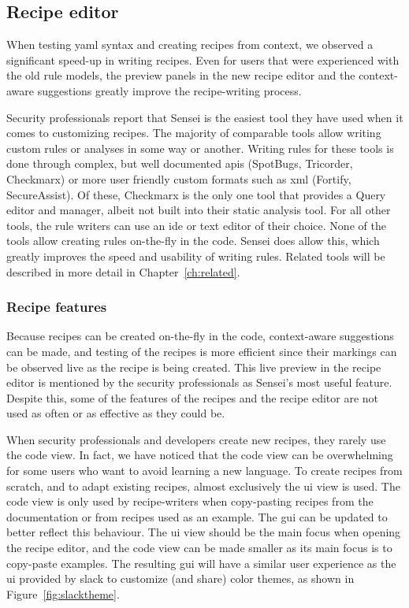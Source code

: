 \subsection{Recipe editor}
When testing \gls{yaml} syntax and creating recipes from context, we observed a significant speed-up in writing recipes.
Even for users that were experienced with the old rule models, the preview panels in the new recipe editor and the context-aware suggestions greatly improve the recipe-writing process.

Security professionals report that Sensei is the easiest tool they have used when it comes to customizing recipes.
The majority of comparable tools allow writing custom rules or analyses in some way or another.
Writing rules for these tools is done through complex, but well documented \glspl{api} (SpotBugs, Tricorder, Checkmarx) or more user friendly custom formats such as \gls{xml} (Fortify, SecureAssist).
Of these, Checkmarx is the only one tool that provides a Query editor and manager, albeit not built into their static analysis tool.
For all other tools, the rule writers can use an \gls{ide} or text editor of their choice.
None of the tools allow creating rules on-the-fly in the code.
Sensei does allow this, which greatly improves the speed and usability of writing rules.
Related tools will be described in more detail in Chapter~\ref{ch:related}.

\subsubsection{Recipe features}
Because recipes can be created on-the-fly in the code, context-aware suggestions can be made, and testing of the recipes is more efficient since their markings can be observed live as the recipe is being created.
This live preview in the recipe editor is mentioned by the security professionals as Sensei's most useful feature.
Despite this, some of the features of the recipes and the recipe editor are not used as often or as effective as they could be.

When security professionals and developers create new recipes, they rarely use the code view.
In fact, we have noticed that the code view can be overwhelming for some users who want to avoid learning a new language.
To create recipes from scratch, and to adapt existing recipes, almost exclusively the \gls{ui} view is used.
The code view is only used by recipe-writers when copy-pasting recipes from the documentation or from recipes used as an example.
The \gls{gui} can be updated to better reflect this behaviour.
The \gls{ui} view should be the main focus when opening the recipe editor, and the code view can be made smaller as its main focus is to copy-paste examples.
The resulting \gls{gui} will have a similar user experience as the \gls{ui} provided by \gls{slack} to customize (and share) color themes, as shown in Figure~\ref{fig:slacktheme}.

